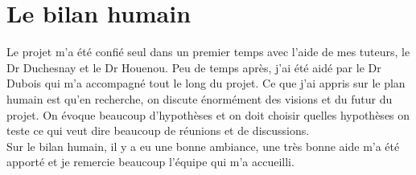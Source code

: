 \section{Le bilan humain}

Le projet m'a été confié seul dans un premier temps avec l'aide de mes tuteurs, le Dr Duchesnay et le Dr Houenou. 
Peu de temps après, j'ai été aidé par le Dr Dubois qui m'a accompagné tout le long du projet. 
Ce que j'ai appris sur le plan humain est qu'en recherche, on discute énormément des visions et du futur du projet. On évoque beaucoup d'hypothèses et on doit choisir quelles hypothèses on teste ce qui veut dire beaucoup de réunions et de discussions. 
\\
Sur le bilan humain, il y a eu une bonne ambiance, une très bonne aide m'a été apporté et je remercie beaucoup l'équipe qui m'a accueilli. 